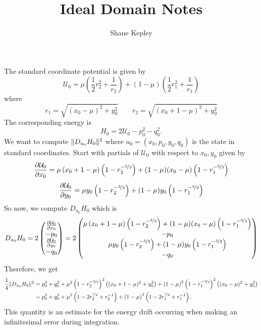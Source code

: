\documentclass[10pt]{article}
\newcommand{\cU}{\mathcal{U}}
\newcommand{\pardiff}[2]{\frac{\partial #1}{\partial #2}}
\DeclarePairedDelimiter{\norm}{\lVert}{\rVert}
\newcommand{\paren}[1]{\left( #1 \right)}
\theoremstyle{definition}
\theoremstyle{remark}
\begin{document}
\title{Ideal Domain Notes}%
\author{Shane Kepley}
\date{}
\maketitle


The standard coordinate potential is given by
\[
\cU_0 = \mu \paren{\frac{1}{2}r_2^2 + \frac{1}{r_2}} + (1-\mu) \paren{\frac{1}{2}r_1^2 + \frac{1}{r_1}}
\]
where
\[
r_1 = \sqrt{\paren{x_0 - \mu}^2 + y_0^2} \qquad r_2 = \sqrt{\paren{x_0 + 1 - \mu}^2 + y_0^2}
\]
The corresponding energy is
\[
H_0 = 2 \cU_0 - p_0^2 - q_0^2.
\]
We want to compute $\norm{D_{u_0} H_0}^2$ where $u_0 = (x_0, p_0, y_0, q_0)$ is the state in standard coordinates. Start with partials of $\cU_0$ with respect to $x_0,y_0$ given by 
\[
\pardiff{\cU_0}{x_0} = \mu \paren{x_0 + 1 - \mu} \paren{1 - r_2^{-\nicefrac{3}{2}}} + (1-\mu)(x_0 - \mu) \paren{1 - r_1^{-\nicefrac{3}{2}}} 
\]
\[
\pardiff{\cU_0}{y_0} = \mu y_0 \paren{1 - r_2^{-\nicefrac{3}{2}}} + (1-\mu) y_0 \paren{1 - r_1^{-\nicefrac{3}{2}}}
\]
So now, we compute $D_{u_0} H_0$ which is 
\begin{align*}
	D_{u_0} H_0 = 
	2
	\begin{pmatrix}
	\pardiff{\cU_0}{x_0} \\
	-p_0 \\
	\pardiff{\cU_0}{y_0} \\
	-q_0
	\end{pmatrix}
	=
	2
	\begin{pmatrix}
	\mu \paren{x_0 + 1 - \mu} \paren{1 - r_2^{-\nicefrac{3}{2}}} + (1-\mu)(x_0 - \mu) \paren{1 - r_1^{-\nicefrac{3}{2}}}  \\
	-p_0 \\
	 \mu y_0 \paren{1 - r_2^{-\nicefrac{3}{2}}} + (1-\mu) y_0 \paren{1 - r_1^{-\nicefrac{3}{2}}} \\
	 -q_0
	\end{pmatrix}
\end{align*}
Therefore, we get 
\begin{align*}
	\frac{1}{4} \norm{D_{u_0} H_0}^2 & = 
	p_0^2 + q_0^2 + \mu^2 \paren{1 - r_2^{-\nicefrac{3}{2}}}^2 \paren{(x_0 + 1 - \mu)^2 + y_0^2} + \paren{1-\mu}^2  \paren{1 - r_1^{-\nicefrac{3}{2}}}^2 \paren{(x_0 - \mu)^2 + y_0^2} \\
	& = p_0^2 + q_0^2 + \mu^2 \paren{1 - 2 r_2^{\nicefrac{1}{2}} + r_2^{-1}}  + \paren{1 - \mu}^2  \paren{1 - 2r_1^{\nicefrac{1}{2}} + r_1^{-1}}.
\end{align*}
This quantity is an estimate for the energy drift occurring when making an infinitesimal error during integration. 
\end{document}
